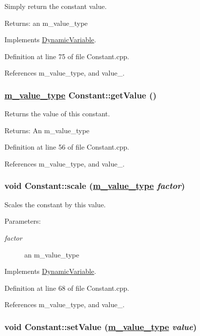 Simply return the constant value. \begin{Desc}
\item[Returns:]an m\_\-value\_\-type \end{Desc}


Implements \hyperlink{classDynamicVariable_a5}{Dynamic\-Variable}.

Definition at line 75 of file Constant.cpp.

References m\_\-value\_\-type, and value\_\-.\hypertarget{classConstant_a3}{
\subsubsection[getValue]{\setlength{\rightskip}{0pt plus 5cm}\hyperlink{Types_8h_a3}{m\_\-value\_\-type} Constant::get\-Value ()}}
\label{classConstant_a3}


Returns the value of this constant. \begin{Desc}
\item[Returns:]An m\_\-value\_\-type \end{Desc}


Definition at line 56 of file Constant.cpp.

References m\_\-value\_\-type, and value\_\-.\hypertarget{classConstant_a5}{
\subsubsection[scale]{\setlength{\rightskip}{0pt plus 5cm}void Constant::scale (\hyperlink{Types_8h_a3}{m\_\-value\_\-type} {\em factor})}}
\label{classConstant_a5}


Scales the constant by this value. \begin{Desc}
\item[Parameters:]
\begin{description}
\item[{\em factor}]an m\_\-value\_\-type \end{description}
\end{Desc}


Implements \hyperlink{classDynamicVariable_a4}{Dynamic\-Variable}.

Definition at line 68 of file Constant.cpp.

References m\_\-value\_\-type, and value\_\-.\hypertarget{classConstant_a2}{
\subsubsection[setValue]{\setlength{\rightskip}{0pt plus 5cm}void Constant::set\-Value (\hyperlink{Types_8h_a3}{m\_\-value\_\-type} {\em value})}}
\label{classConstant_a2}


